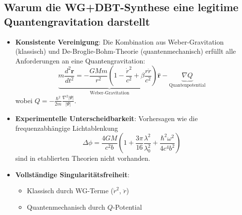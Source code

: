 
\subsection*{Warum die WG+DBT-Synthese eine legitime Quantengravitation darstellt}
\begin{itemize}
    \item \textbf{Konsistente Vereinigung}: Die Kombination aus Weber-Gravitation (klassisch) und De-Broglie-Bohm-Theorie (quantenmechanisch) erfüllt alle Anforderungen an eine Quantengravitation:
    \begin{equation}
        \underbrace{m\frac{d^2\mathbf{r}}{dt^2} = -\frac{GMm}{r^2}\left(1-\frac{\dot{r}^2}{c^2}+\beta\frac{r\ddot{r}}{c^2}\right)\hat{\mathbf{r}}}_{\text{Weber-Gravitation}} - \underbrace{\nabla Q}_{\text{Quantenpotential}}
    \end{equation}
    wobei $Q = -\frac{\hbar^2}{2m}\frac{\nabla^2|\Psi|}{|\Psi|}$.
    
    \item \textbf{Experimentelle Unterscheidbarkeit}: Vorhersagen wie die frequenzabhängige Lichtablenkung
    \begin{equation}
        \Delta\phi = \frac{4GM}{c^2b}\left(1 + \frac{3\pi}{16}\frac{\lambda^2}{\lambda_0^2} + \frac{\hbar^2\omega^2}{4c^4b^2}\right)
    \end{equation}
    sind in etablierten Theorien nicht vorhanden.
    
    \item \textbf{Vollständige Singularitätsfreiheit}: 
    \begin{itemize}
        \item Klassisch durch WG-Terme ($\dot{r}^2$, $\ddot{r}$)
        \item Quantenmechanisch durch $Q$-Potential
    \end{itemize}
\end{itemize}

